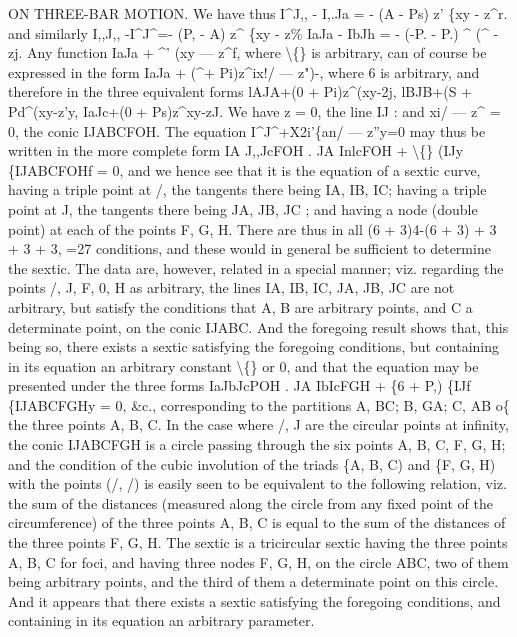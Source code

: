 \documentclass[11pt,a4paper]{book}
\begin{document}
ON THREE-BAR MOTION.
We have thus
I\textasciicircum{}J,, - I,.Ja = - (A - Ps) z' \{xy - z\textasciicircum{}r.
and
similarly
I,,J,, -I\textasciicircum{}J\textasciicircum{}=- (P, - A) z\textasciicircum{} \{xy - z\%
IaJa - IbJh = - (-P. - P.) \textasciicircum{} (\textasciicircum{} - zj.
Any function IaJa + \textasciicircum{}' (xy --- z\textasciicircum{}f, where \textbackslash\{\}
is
arbitrary, can
of
course
be expressed
in
the
form
IaJa + (\textasciicircum{}+ Pi)z\textasciicircum{}ix!/ --- z")-,
where
6
is
arbitrary,
and
therefore
in
the
three equivalent forms
lAJA+(0 + Pi)z\textasciicircum{}(xy-2j,
lBJB+(S + Pd\textasciicircum{}(xy-z'y,
IaJc+(0 + Ps)z\textasciicircum{}xy-zJ.
We have z = 0, the
line IJ
:
and
xi/ --- z\textasciicircum{} = 0, the conic IJABCFOH.
The
equation
I\textasciicircum{}J\textasciicircum{}+X2i'\{an/ --- z''y=0 may thus be written
in the more complete form
IA J,,JcFOH . JA InlcFOH + \textbackslash\{\} (IJy \{IJABCFOHf = 0,
and we
hence
see
that
it
is
the
equation
of
a
sextic
curve,
having
a
triple
point
at
/,
the
tangents
there
being IA, IB, IC;
having
a
triple
point
at J, the
tangents
there
being JA,
JB, JC
;
and
having
a
node
(double
point)
at
each
of
the
points
F,
G, H.
There
are
thus
in
all
(6 + 3)4-(6 + 3) + 3 + 3 + 3, =27
conditions, and
these
would
in
general
be
sufficient
to
determine
the
sextic.
The
data
are,
however,
related
in
a
special
manner;
viz.
regarding
the
points
/,
J,
F,
0, H
as
arbitrary,
the
lines IA,
IB,
IC, JA, JB, JC
are
not
arbitrary,
but
satisfy
the
conditions
that
A, B
are
arbitrary
points,
and C
a
determinate
point,
on
the
conic IJABC.
And
the
foregoing
result
shows
that,
this
being
so,
there
exists
a
sextic
satisfying
the
foregoing
conditions,
but
containing
in
its
equation
an
arbitrary
constant \textbackslash\{\}
or
0, and
that the equation may be presented under the three forms
IaJbJcPOH
. JA IbIcFGH + \{6 + P,) \{IJf \{IJABCFGHy = 0,
\&c.,
corresponding
to the partitions A, BC;
B, GA;
C, AB o\{ the three points A, B,
C.
In
the
case
where
/, J
are
the
circular
points
at
infinity,
the conic IJABCFGH
is
a
circle
passing
through
the
six
points
A,
B,
C,
F,
G, H;
and
the
condition
of
the
cubic
involution
of
the
triads \{A, B, C)
and
\{F,
G, H) with
the
points
(/, /)
is
easily
seen
to
be
equivalent
to
the
following
relation,
viz.
the
sum
of
the
distances
(measured
along
the
circle
from
any
fixed
point
of
the
circumference)
of
the
three
points
A,
B, C
is
equal
to
the sum
of
the
distances
of
the
three
points
F,
G, H.
The
sextic
is
a
tricircular
sextic
having
the
three
points
A,
B, C
for
foci,
and
having
three
nodes
F,
G, H,
on
the
circle ABC,
two
of them
being
arbitrary
points,
and
the
third
of them
a determinate
point
on
this
circle.
And
it
appears
that
there
exists
a
sextic
satisfying
the
foregoing
conditions,
and
containing
in
its
equation
an
arbitrary parameter.
\end{document}
